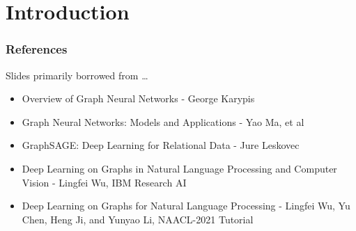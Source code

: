 \section[Intro]{Introduction}























\begin{frame}[fragile]\frametitle{References}
Slides primarily borrowed from \ldots

\begin{itemize}
\item Overview of Graph Neural Networks - George Karypis
\item Graph Neural Networks: Models and Applications - Yao Ma, et al
\item GraphSAGE: Deep Learning for Relational Data - Jure Leskovec
\item Deep Learning on Graphs in Natural Language Processing and Computer Vision - Lingfei Wu, IBM Research AI
\item Deep Learning on Graphs for Natural Language Processing - Lingfei Wu, Yu Chen, Heng Ji, and Yunyao Li, NAACL-2021 Tutorial

\end{itemize}

\end{frame}
